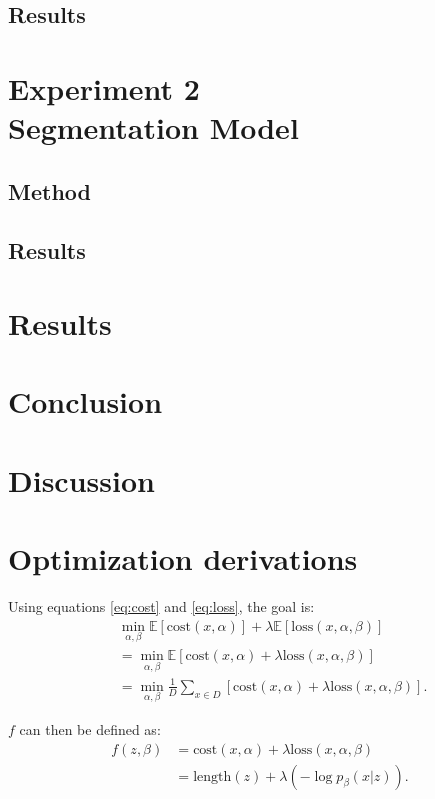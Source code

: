 \documentclass[a4paper, 12pt]{report}
\begin{document}
\section{Results}

\chapter{Experiment 2 \\ Segmentation Model}
\section{Method}
\section{Results}

\chapter{Results}

\chapter{Conclusion}

\chapter{Discussion}




\appendix
\chapter{Optimization derivations}
\label{app:gradients}
Using equations \ref{eq:cost} and \ref{eq:loss}, the goal is:
\begin{align*}
    \quad & \min_{\alpha, \beta} \mathbb{E} [\text{cost}(x, \alpha)] + \lambda \mathbb{E}[\text{loss}(x, \alpha, \beta)] \\
    &= \min_{\alpha, \beta} \mathbb{E} [\text{cost}(x, \alpha) + \lambda \text{loss}(x, \alpha, \beta)] \\
    &= \min_{\alpha, \beta} \frac{1}{D} \sum_{x \in D}[\text{cost}(x, \alpha) + \lambda \text{loss}(x, \alpha, \beta)].
\end{align*}

\noindent $f$ can then be defined as:
\begin{align*}
    f(z, \beta) &= \text{cost}(x, \alpha) + \lambda \text{loss}(x, \alpha, \beta) \\
    &= \text{length}(z) + \lambda (-\log p_{\beta}(x|z)).
\end{align*}
\end{document}
